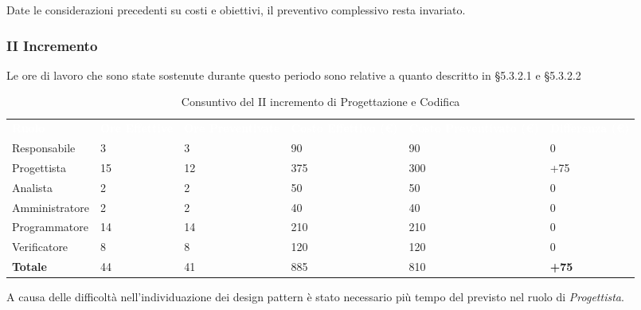 Date le considerazioni precedenti su costi e obiettivi, il preventivo complessivo resta invariato.

\pagebreak


\subsubsection{II Incremento}
Le ore di lavoro che sono state sostenute durante questo periodo sono relative a quanto descritto in §5.3.2.1 e §5.3.2.2

\begin{table}[H]
\begin{center}
\renewcommand{\arraystretch}{1.5}
\begin{tabular}{ m{}<{\centering}  m{}<{\centering} m{}<{\centering} m{}<{\centering} m{}<{\centering} m{}<{\centering}}
	\rowcolor{darkblue}
	\textcolor{white}{\textbf{Ruolo}} & \textcolor{white}{\textbf{Ore Effettive}} & \textcolor{white}{\textbf{Ore Preventivate}}&\textcolor{white}{\textbf{Costo Effettivo (\euro)}}&\textcolor{white}{\textbf{Costo Preventivato (\euro)}}&\textcolor{white}{\textbf{Differenza (\euro)}}\\ 

	Responsabile  & 3 & 3 & 90 & 90 & 0\\	
	
	Progettista & 15 & 12 & 375 & 300 & +75\\
	
	Analista & 2 & 2 & 50 & 50 & 0\\
	
	Amministratore & 2 & 2 & 40 & 40 & 0\\
	
	Programmatore & 14 & 14 & 210 & 210 & 0\\
	
	Verificatore & 8 & 8 & 120 & 120 & 0\\
	
	\textbf{Totale} & 44 & 41 & 885 & 810 & \textbf{+75} \\
	
\end{tabular}
\caption{Consuntivo del II incremento di Progettazione e Codifica}
\end{center}
\end{table}

A causa delle difficoltà nell'individuazione dei design pattern è stato necessario più tempo del previsto nel ruolo di \textit{Progettista}.

